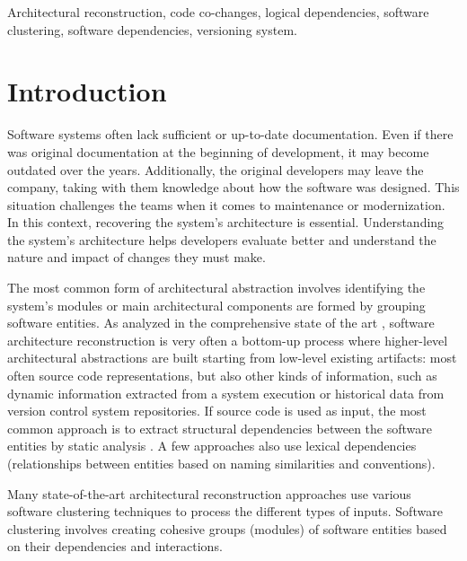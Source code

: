 \documentclass{ieeeaccess}
\begin{document}
\begin{keywords}
Architectural reconstruction, code co-changes, logical dependencies, software clustering, software dependencies, versioning system.
\end{keywords}

\titlepgskip=-21pt

\maketitle

\section{Introduction}
\label{sec:introduction}

Software systems often lack sufficient or up-to-date documentation. Even if there was original documentation at the beginning of development, it may become outdated over the years. Additionally, the original developers may leave the company, taking with them knowledge about how the software was designed. This situation challenges the teams when it comes to maintenance or modernization. In this context, recovering the system's architecture is essential. Understanding the system's architecture helps developers evaluate better and understand the nature and impact of changes they must make. 

The most common form of architectural abstraction involves identifying the system's modules or main architectural components are formed by grouping software entities. As analyzed in the comprehensive state of the art \cite{ducassepollet}, software architecture reconstruction is very often a bottom-up process where higher-level architectural abstractions are built starting from low-level existing artifacts: most often source code representations, but also other kinds of information, such as dynamic information extracted from a system execution or historical data from version control system repositories. If source code is used as input, the most common approach is to extract structural dependencies between the software entities by static analysis
\cite{tzerpos1, wu, b10, bunch, b12, b19}. A few approaches \cite{acdc, b18} also use lexical dependencies (relationships between entities based on naming similarities and conventions).

Many state-of-the-art architectural reconstruction approaches use various software clustering techniques to process the different types of inputs. Software clustering involves creating cohesive groups (modules) of software entities based on their dependencies and interactions.
\end{document}
